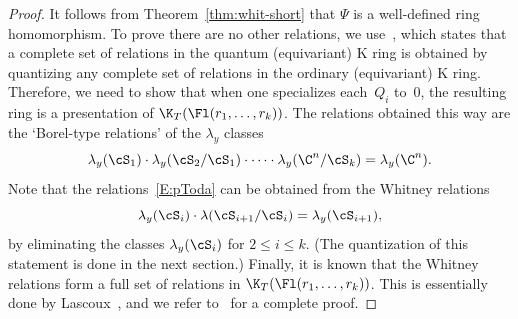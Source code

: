 \begin{proof}
It follows from Theorem~\ref{thm:whit-short} that $\Psi$ is a well-defined ring homomorphism.
To prove there are no other relations, we use~\cite[Theorem~4.1]{GMSXZZ:Nakayama}, which
states that a complete set of relations in the quantum (equivariant) K ring is
obtained by quantizing any complete set of relations in the ordinary (equivariant) K ring.
Therefore, we need to show that when one specializes each~$Q_i$ to~$0$, the resulting
ring is a presentation of $\K_T(\Fl(r_1,\dots,r_k))$.
The relations obtained this way
are the `Borel-type relations' of the $\lambda_y$ classes
\begin{equation}\label{E:pToda} \lambda_y(\cS_1) \cdot \lambda_y(\cS_2/\cS_1)\cdot \dots \cdot \lambda_y(\C^n/\cS_k) = \lambda_y(\C^n) . \end{equation}
Note that the relations~\eqref{E:pToda} can be obtained from the Whitney relations
\[ \lambda_y(\cS_i) \cdot \lambda(\cS_{i+1}/\cS_i) = \lambda_y(\cS_{i+1}) , \]
by eliminating the classes $\lambda_y(\cS_i)$ for $2 \le i \le k$.
(The quantization of this statement is done in the next section.)
Finally, it is known that
the Whitney relations form a full set of relations
in $\K_T(\Fl(r_1,\dots,r_k))$. This is essentially done by Lascoux~\cite[Section~7]{lascoux:anneau},
and we refer to~\cite[Proposition~5.1]{GMSXZZ:Nakayama} for a complete proof.
\end{proof}
